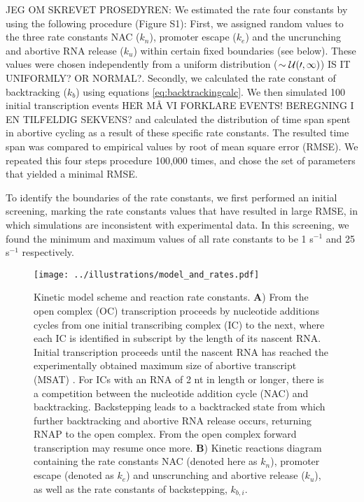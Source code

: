 JEG OM SKREVET PROSEDYREN:
We estimated the rate four constants by using the following procedure (Figure S1): First, we assigned random values to the three rate constants NAC ($k_n$), promoter escape ($k_e$) and the uncrunching and abortive RNA release ($k_u$) within certain fixed boundaries (see below).  These values were chosen independently from a uniform distribution ($\sim \cal U (0,1)$) IS IT UNIFORMLY? OR NORMAL?. Secondly, we calculated the rate constant of backtracking ($k_b$) using equations \ref{eq:backtrackingcalc}. We then simulated 100 initial transcription events HER MÅ VI FORKLARE EVENTS! BEREGNING I EN TILFELDIG SEKVENS? and calculated the distribution of time span spent in abortive cycling as a result of these specific rate constants. The resulted time span was compared to empirical values \cite{revyakin_abortive_2006} by root of mean square error (RMSE). We repeated this four steps procedure 100,000 times, and chose the set of parameters that yielded a minimal RMSE.  

To identify the boundaries of the rate constants, we first performed
an initial screening, marking the rate constants values that have resulted in large RMSE, in which simulations are inconsistent with experimental data. In this screening, we found the minimum and maximum values of all rate constants to be
1 s$^{-1}$ and 25 s$^{-1}$ respectively. 

\begin{figure}
	\begin{center}
        \texttt{[image: ../illustrations/model\_and\_rates.pdf]}
	\end{center}
    \caption{Kinetic model scheme and reaction rate constants.  \textbf{A})
    From the open complex (OC) transcription proceeds by nucleotide additions
    cycles from one initial transcribing complex (IC) to the next, where each
    IC is identified in subscript by the length of its nascent RNA. Initial
    transcription proceeds until the nascent RNA has reached the
    experimentally obtained maximum size of abortive transcript (MSAT)
    \cite{hsu_initial_2006}. For ICs with an RNA of 2 nt in length or longer, there is a
    competition between the nucleotide addition cycle (NAC) and backtracking.
    Backstepping leads to a backtracked state from which further backtracking
    and abortive RNA release occurs, returning RNAP to the open complex. From
    the open complex forward transcription may resume once more. \textbf{B})
    Kinetic reactions diagram containing the rate
    constants NAC (denoted here as $k_n$), promoter escape (denoted as $k_e$) and unscrunching and abortive
    release ($k_u$), as well as the rate constants of backstepping, $k_{b,i}$.}
    \label{fig:model_and_rates}
\end{figure}
